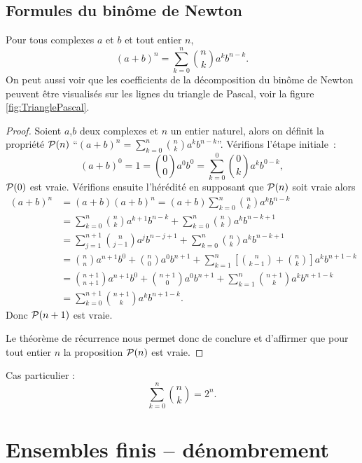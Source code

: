 \subsection{Formules du binôme de Newton}

\begin{prop}
  Pour tous complexes \(a\) et \(b\) et tout entier \(n\),
  \begin{equation}
    (a+b)^n=\sum_{k=0}^n \binom{n}{k}a^kb^{n-k}.
  \end{equation}
  On peut aussi voir que les coefficients de la décomposition du binôme de Newton peuvent être visualisés sur les lignes du triangle de Pascal, voir la figure \ref{fig:TrianglePascal}.
\end{prop}
\begin{proof}
  Soient \(a\),\(b\) deux complexes et \(n\) un entier naturel, alors on définit la propriété \(\P(n)\) ``\((a+b)^n=\sum_{k=0}^n \binom{n}{k}a^kb^{n-k}\)''. Vérifions l'étape initiale~:
\begin{equation}
  (a+b)^0=1=\binom{0}{0}a^0b^0=\sum_{k=0}^0 \binom{0}{k}a^kb^{0-k},
\end{equation}
\(\P(0)\) est vraie. Vérifions ensuite l'hérédité en supposant que \(\P(n)\) soit vraie alors
\begin{align}
  (a+b)^n&=(a+b)(a+b)^n=(a+b)\sum_{k=0}^n \binom{n}{k}a^kb^{n-k}\\
  &=\sum_{k=0}^n \binom{n}{k}a^{k+1}b^{n-k}+\sum_{k=0}^n \binom{n}{k}a^kb^{n-k+1}\\
  &=\sum_{j=1}^{n+1} \binom{n}{j-1}a^{j}b^{n-j+1}+\sum_{k=0}^n \binom{n}{k}a^kb^{n-k+1}\\
  &=\binom{n}{n}a^{n+1}b^0 +\binom{n}{0}a^0b^{n+1} + \sum_{k=1}^{n}\left[\binom{n}{k-1}+\binom{n}{k}\right]a^kb^{n+1-k}\\
  &=\binom{n+1}{n+1}a^{n+1}b^0+\binom{n+1}{0}a^0b^{n+1}+ \sum_{k=1}^{n}\binom{n+1}{k}a^kb^{n+1-k}\\
  &=\sum_{k=0}^{n+1}\binom{n+1}{k}a^kb^{n+1-k}.
\end{align}
Donc \(\P(n+1)\) est vraie.

Le théorème de récurrence nous permet donc de conclure et d'affirmer que pour tout entier \(n\) la proposition \(\P(n)\) est vraie.
\end{proof}
Cas particulier :
\begin{equation}
  \sum_{k=0}^n \binom{n}{k}=2^n.
\end{equation}

\section{Ensembles finis -- dénombrement}

